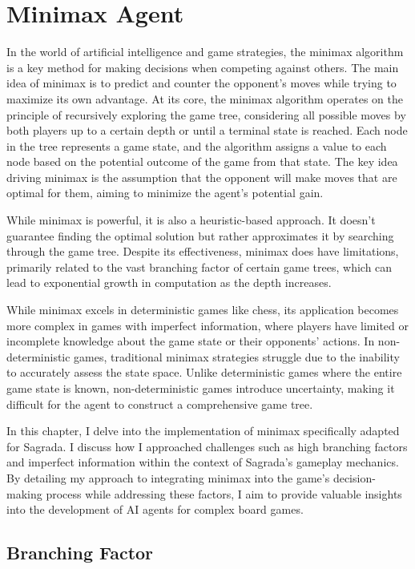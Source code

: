 \chapter{Minimax Agent}

In the world of artificial intelligence and game strategies, the minimax algorithm is a key method for making decisions when competing against others.
The main idea of minimax is to predict and counter the opponent's moves while trying to maximize its own advantage.
At its core, the minimax algorithm operates on the principle of recursively exploring the game tree, considering all possible moves by both players 
up to a certain depth or until a terminal state is reached. Each node in the tree represents a game state, and the algorithm assigns a value to 
each node based on the potential outcome of the game from that state. The key idea driving minimax is the assumption that the opponent will make 
moves that are optimal for them, aiming to minimize the agent's potential gain.

While minimax is powerful, it is also a heuristic-based approach. It doesn't guarantee finding the optimal solution but rather approximates it by 
searching through the game tree. Despite its effectiveness, minimax does have limitations, primarily related to the vast branching factor of certain game trees, 
which can lead to exponential growth in computation as the depth increases. 

While minimax excels in deterministic games like chess, its application becomes more complex in games with imperfect information, 
where players have limited or incomplete knowledge about the game state or their opponents' actions. In non-deterministic games, traditional minimax 
strategies struggle due to the inability to accurately assess the state space. Unlike deterministic games where the entire game state is known, 
non-deterministic games introduce uncertainty, making it difficult for the agent to construct a comprehensive game tree.

In this chapter, I delve into the implementation of minimax specifically adapted for Sagrada. I discuss how I approached challenges such as 
high branching factors and imperfect information within the context of Sagrada's gameplay mechanics. By detailing my approach to integrating minimax into 
the game's decision-making process while addressing these factors, I aim to provide valuable insights into the development of AI agents for complex board games.

\section{Branching Factor}

